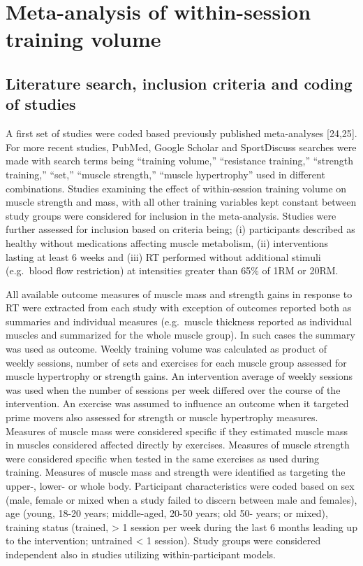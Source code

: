 \documentclass[twoside,10pt]{gihclass} %
\begin{document}
\hypertarget{meta-analysis-of-within-session-training-volume}{%
\section{Meta-analysis of within-session training volume}\label{meta-analysis-of-within-session-training-volume}}

\hypertarget{literature-search-inclusion-criteria-and-coding-of-studies}{%
\subsection{Literature search, inclusion criteria and coding of studies}\label{literature-search-inclusion-criteria-and-coding-of-studies}}

A first set of studies were coded based previously published
meta-analyses {[}24,25{]}. For more recent studies, PubMed, Google
Scholar and SportDiscuss searches were made with search terms being
``training volume,'' ``resistance training,'' ``strength training,'' ``set,''
``muscle strength,'' ``muscle hypertrophy'' used in different combinations.
Studies examining the effect of within-session training volume on muscle
strength and mass, with all other training variables kept constant
between study groups were considered for inclusion in the meta-analysis.
Studies were further assessed for inclusion based on criteria being; (i)
participants described as healthy without medications affecting muscle
metabolism, (ii) interventions lasting at least 6 weeks and (iii) RT
performed without additional stimuli (e.g.~blood flow restriction) at
intensities greater than 65\% of 1RM or 20RM.

All available outcome measures of muscle mass and strength gains in
response to RT were extracted from each study with exception of outcomes
reported both as summaries and individual measures (e.g.~muscle
thickness reported as individual muscles and summarized for the whole
muscle group). In such cases the summary was used as outcome. Weekly
training volume was calculated as product of weekly sessions, number of
sets and exercises for each muscle group assessed for muscle hypertrophy
or strength gains. An intervention average of weekly sessions was used
when the number of sessions per week differed over the course of the
intervention. An exercise was assumed to influence an outcome when it
targeted prime movers also assessed for strength or muscle hypertrophy
measures.
Measures of muscle mass were considered specific if they estimated muscle mass in muscles considered affected directly by exercises. Measures of muscle strength were considered specific when tested in the same exercises as used during training.
Measures of muscle mass and strength were identified as targeting the upper-, lower- or whole body.
Participant characteristics were coded based on sex (male,
female or mixed when a study failed to discern between male and
females), age (young, 18-20 years; middle-aged, 20-50 years; old 50- years; or mixed), training status (trained, \textgreater{} 1 session per week during the
last 6 months leading up to the intervention; untrained \textless{} 1 session).
Study groups were considered independent also in studies utilizing
within-participant models.
\end{document}
